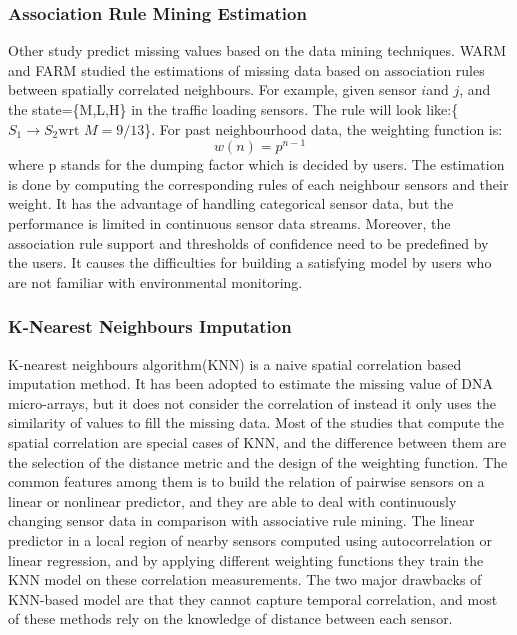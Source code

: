 \subsubsection{Association Rule Mining Estimation}
 Other study predict missing values based on the data mining techniques. WARM\cite{Gruenwald:WARM} and FARM\cite{Gruenwald:FARM} studied the estimations of missing data based on association rules between spatially correlated neighbours. For example, given sensor $i$and $j$, and the state=\{M,L,H\} in the traffic loading sensors. The rule will look like:\{$S_{1} \rightarrow S_{2} \mbox{wrt }  M = 9/13$\}. For past neighbourhood data, the weighting function is:
 \begin{equation}
 w(n) = p^{n-1}
\end{equation}
where p stands for the dumping factor which is decided by users. The estimation is done by computing the corresponding rules of each neighbour sensors and their weight.
 It has the advantage of handling categorical sensor data, but the performance is limited in continuous sensor data streams. Moreover, the association rule support and thresholds of confidence need to be predefined by the users. It causes the difficulties for building a satisfying model by users who are not familiar with environmental monitoring. 
\subsubsection{K-Nearest Neighbours Imputation} 
 K-nearest neighbours algorithm(KNN) is a naive spatial correlation based imputation method. It has been adopted to estimate the missing value of DNA micro-arrays\cite{Troyanskaya:DNAKNN}, but it does not consider the correlation of  instead it only uses the similarity of values to fill the missing data. Most of the studies that compute the spatial correlation are special cases of KNN, and the difference between them are the selection of the distance metric and the design of the weighting function. The common features among them is to build the relation of pairwise sensors on a linear or nonlinear predictor\cite{Lim:robust}\cite{LI:DESM}\cite{pan:ake}\cite{Jian-Zhong:STI}\cite{zhang:skif}, and they are able to deal with continuously changing sensor data in comparison with associative rule mining. The linear predictor in a local region of nearby sensors computed using autocorrelation or linear regression, and by applying different weighting functions they train the KNN model on these correlation measurements. The two major drawbacks of KNN-based model are that they cannot capture temporal correlation, and most of these methods rely on the knowledge of distance between each sensor.
